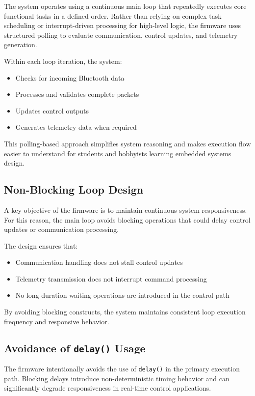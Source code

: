 The system operates using a continuous main loop that repeatedly executes core functional tasks in a defined order. Rather than relying on complex task scheduling or interrupt-driven processing for high-level logic, the firmware uses structured polling to evaluate communication, control updates, and telemetry generation.

Within each loop iteration, the system:

\begin{itemize}
	\item Checks for incoming Bluetooth data
	\item Processes and validates complete packets
	\item Updates control outputs
	\item Generates telemetry data when required
\end{itemize}

This polling-based approach simplifies system reasoning and makes execution flow easier to understand for students and hobbyists learning embedded systems design.

\subsection{Non-Blocking Loop Design}

A key objective of the firmware is to maintain continuous system responsiveness. For this reason, the main loop avoids blocking operations that could delay control updates or communication processing.

The design ensures that:

\begin{itemize}
	\item Communication handling does not stall control updates
	\item Telemetry transmission does not interrupt command processing
	\item No long-duration waiting operations are introduced in the control path
\end{itemize}

By avoiding blocking constructs, the system maintains consistent loop execution frequency and responsive behavior.

\subsection{Avoidance of \texttt{delay()} Usage}

The firmware intentionally avoids the use of \texttt{delay()} in the primary execution path. Blocking delays introduce non-deterministic timing behavior and can significantly degrade responsiveness in real-time control applications.

